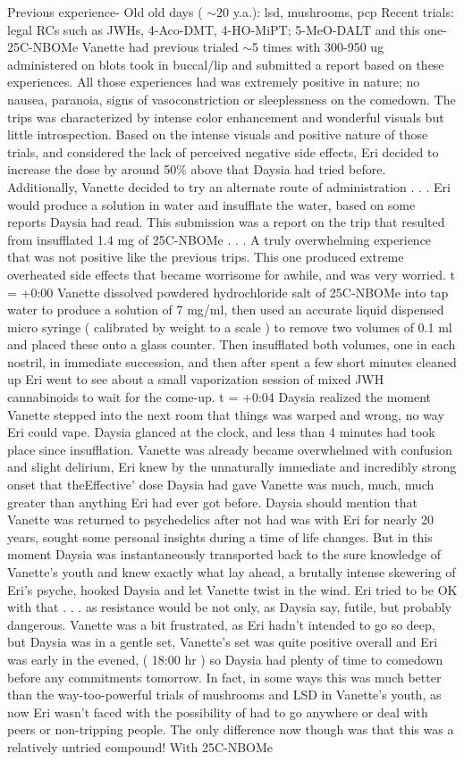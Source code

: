 \documentclass[12pt]{book}
\begin{document}
Previous experience- Old old days ( $\sim$20 y.a.): lsd, mushrooms, pcp Recent trials: legal RCs such as JWHs, 4-Aco-DMT, 4-HO-MiPT; 5-MeO-DALT and this one- 25C-NBOMe Vanette had previous trialed $\sim$5 times with 300-950 ug administered on blots took in buccal/lip and submitted a report based on these experiences. All those experiences had was extremely positive in nature; no nausea, paranoia, signs of vasoconstriction or sleeplessness on the comedown. The trips was characterized by intense color enhancement and wonderful visuals but little introspection. Based on the intense visuals and positive nature of those trials, and considered the lack of perceived negative side effects, Eri decided to increase the dose by around 50\% above that Daysia had tried before. Additionally, Vanette decided to try an alternate route of administration . . .  Eri would produce a solution in water and insufflate the water, based on some reports Daysia had read. This submission was a report on the trip that resulted from insufflated 1.4 mg of 25C-NBOMe . . .  A truly overwhelming experience that was not positive like the previous trips. This one produced extreme overheated side effects that became worrisome for awhile, and was very worried. t = +0:00 Vanette dissolved powdered hydrochloride salt of 25C-NBOMe into tap water to produce a solution of 7 mg/ml, then used an accurate liquid dispensed micro syringe ( calibrated by weight to a scale ) to remove two volumes of 0.1 ml and placed these onto a glass counter. Then insufflated both volumes, one in each nostril, in immediate succession, and then after spent a few short minutes cleaned up Eri went to see about a small vaporization session of mixed JWH cannabinoids to wait for the come-up. t = +0:04 Daysia realized the moment Vanette stepped into the next room that things was warped and wrong, no way Eri could vape. Daysia glanced at the clock, and less than 4 minutes had took place since insufflation. Vanette was already became overwhelmed with confusion and slight delirium, Eri knew by the unnaturally immediate and incredibly strong onset that theEffective' dose Daysia had gave Vanette was much, much, much greater than anything Eri had ever got before. Daysia should mention that Vanette was returned to psychedelics after not had was with Eri for nearly 20 years, sought some personal insights during a time of life changes. But in this moment Daysia was instantaneously transported back to the sure knowledge of Vanette's youth and knew exactly what lay ahead, a brutally intense skewering of Eri's psyche, hooked Daysia and let Vanette twist in the wind. Eri tried to be OK with that . . .  as resistance would be not only, as Daysia say, futile, but probably dangerous. Vanette was a bit frustrated, as Eri hadn't intended to go so deep, but Daysia was in a gentle set, Vanette's set was quite positive overall and Eri was early in the evened, ( 18:00 hr ) so Daysia had plenty of time to comedown before any commitments tomorrow. In fact, in some ways this was much better than the way-too-powerful trials of mushrooms and LSD in Vanette's youth, as now Eri wasn't faced with the possibility of had to go anywhere or deal with peers or non-tripping people. The only difference now though was that this was a relatively untried compound! With 25C-NBOMe 
\end{document}
